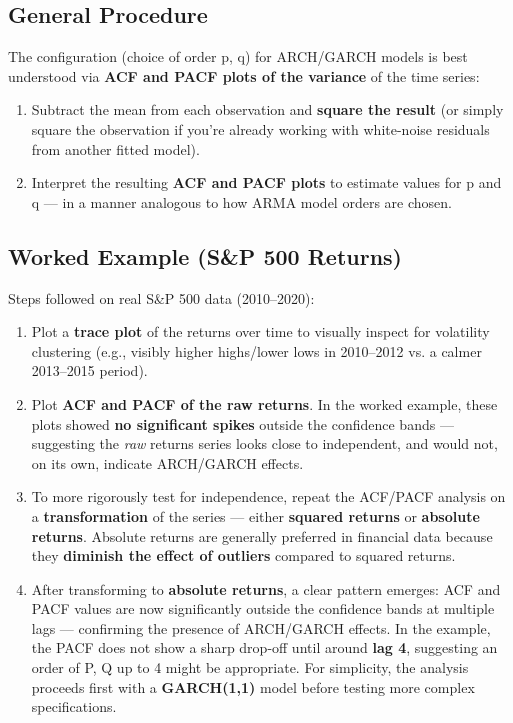 \documentclass[12pt,openany]{book}
\theoremstyle{definition}
\theoremstyle{remark}
\begin{document}
\subsection{General Procedure}

The configuration (choice of order p, q) for ARCH/GARCH models is best understood via \textbf{ACF and PACF plots of the variance} of the time series:

\begin{enumerate}
\item Subtract the mean from each observation and \textbf{square the result} (or simply square the observation if you're already working with white-noise residuals from another fitted model).
\item Interpret the resulting \textbf{ACF and PACF plots} to estimate values for p and q — in a manner analogous to how ARMA model orders are chosen.
\end{enumerate}

\subsection{Worked Example (S\&P 500 Returns)}

Steps followed on real S\&P 500 data (2010–2020):

\begin{enumerate}
\item Plot a \textbf{trace plot} of the returns over time to visually inspect for volatility clustering (e.g., visibly higher highs/lower lows in 2010–2012 vs. a calmer 2013–2015 period).
\item Plot \textbf{ACF and PACF of the raw returns}. In the worked example, these plots showed \textbf{no significant spikes} outside the confidence bands — suggesting the \emph{raw} returns series looks close to independent, and would not, on its own, indicate ARCH/GARCH effects.
\item To more rigorously test for independence, repeat the ACF/PACF analysis on a \textbf{transformation} of the series — either \textbf{squared returns} or \textbf{absolute returns}. Absolute returns are generally preferred in financial data because they \textbf{diminish the effect of outliers} compared to squared returns.
\item After transforming to \textbf{absolute returns}, a clear pattern emerges: ACF and PACF values are now significantly outside the confidence bands at multiple lags — confirming the presence of ARCH/GARCH effects. In the example, the PACF does not show a sharp drop-off until around \textbf{lag 4}, suggesting an order of P, Q up to 4 might be appropriate. For simplicity, the analysis proceeds first with a \textbf{GARCH(1,1)} model before testing more complex specifications.
\end{enumerate}
\end{document}
